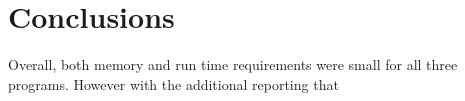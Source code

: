 \section{Conclusions}
Overall, both memory and run time requirements were small for all three programs. However with the additional reporting that 
  